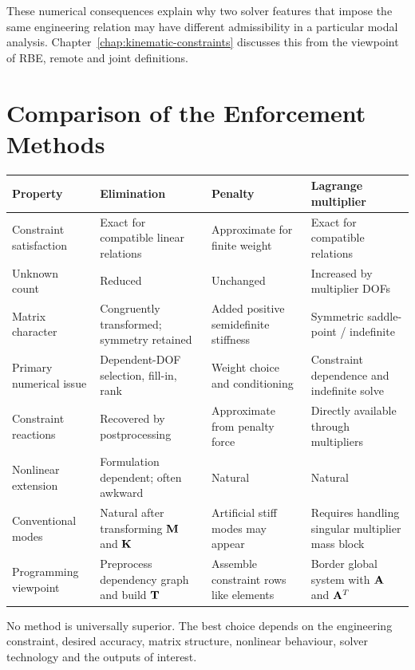 These numerical consequences explain why two solver features that impose the
same engineering relation may have different admissibility in a particular
modal analysis. Chapter~\ref{chap:kinematic-constraints} discusses this from the
viewpoint of RBE, remote and joint definitions.

\section{Comparison of the Enforcement Methods}

\begin{center}
\begin{tabular}{|p{}|p{}|p{}|p{}|}
\hline
\textbf{Property} & \textbf{Elimination} & \textbf{Penalty} & \textbf{Lagrange multiplier} \\
\hline
Constraint satisfaction & Exact for compatible linear relations & Approximate for finite weight & Exact for compatible relations \\
\hline
Unknown count & Reduced & Unchanged & Increased by multiplier DOFs \\
\hline
Matrix character & Congruently transformed; symmetry retained & Added positive semidefinite stiffness & Symmetric saddle-point / indefinite \\
\hline
Primary numerical issue & Dependent-DOF selection, fill-in, rank & Weight choice and conditioning & Constraint dependence and indefinite solve \\
\hline
Constraint reactions & Recovered by postprocessing & Approximate from penalty force & Directly available through multipliers \\
\hline
Nonlinear extension & Formulation dependent; often awkward & Natural & Natural \\
\hline
Conventional modes & Natural after transforming $\mathbf{M}$ and $\mathbf{K}$ & Artificial stiff modes may appear & Requires handling singular multiplier mass block \\
\hline
Programming viewpoint & Preprocess dependency graph and build $\mathbf{T}$ & Assemble constraint rows like elements & Border global system with $\mathbf{A}$ and $\mathbf{A}^T$ \\
\hline
\end{tabular}
\end{center}

No method is universally superior. The best choice depends on the engineering
constraint, desired accuracy, matrix structure, nonlinear behaviour, solver
technology and the outputs of interest.


